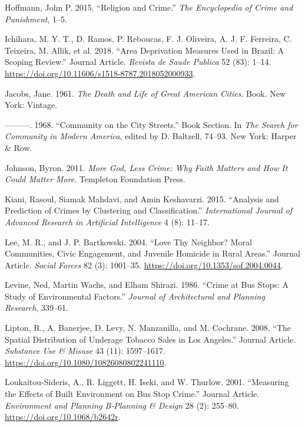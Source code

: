 \documentclass[smallextended]{svjour3}       %
\begin{document}
\leavevmode\hypertarget{ref-Hoffmann2015religion}{}%
Hoffmann, John P. 2015. ``Religion and Crime.'' \emph{The Encyclopedia
of Crime and Punishment}, 1--5.

\leavevmode\hypertarget{ref-Ichihara2018area}{}%
Ichihara, M. Y. T., D. Ramos, P. Reboucas, F. J. Oliveira, A. J. F.
Ferreira, C. Teixeira, M. Allik, et al. 2018. ``Area Deprivation
Measures Used in Brazil: A Scoping Review.'' Journal Article.
\emph{Revista de Saude Publica} 52 (83): 1--14.
\url{https://doi.org/10.11606/s1518-8787.2018052000933}.

\leavevmode\hypertarget{ref-Jacobs1961death}{}%
Jacobs, Jane. 1961. \emph{The Death and Life of Great American Cities}.
Book. New York: Vintage.

\leavevmode\hypertarget{ref-Jacobs1968community}{}%
---------. 1968. ``Community on the City Streets.'' Book Section. In
\emph{The Search for Community in Modern America}, edited by D.
Baltzell, 74--93. New York: Harper \& Row.

\leavevmode\hypertarget{ref-Johnson2011more}{}%
Johnson, Byron. 2011. \emph{More God, Less Crime: Why Faith Matters and
How It Could Matter More}. Templeton Foundation Press.

\leavevmode\hypertarget{ref-Kiani2015analysis}{}%
Kiani, Rasoul, Siamak Mahdavi, and Amin Keshavarzi. 2015. ``Analysis and
Prediction of Crimes by Clustering and Classification.''
\emph{International Journal of Advanced Research in Artificial
Intelligence} 4 (8): 11--17.

\leavevmode\hypertarget{ref-Lee2004love}{}%
Lee, M. R., and J. P. Bartkowski. 2004. ``Love Thy Neighbor? Moral
Communities, Civic Engagement, and Juvenile Homicide in Rural Areas.''
Journal Article. \emph{Social Forces} 82 (3): 1001--35.
\url{https://doi.org/10.1353/sof.2004.0044}.

\leavevmode\hypertarget{ref-Levine1986crime}{}%
Levine, Ned, Martin Wachs, and Elham Shirazi. 1986. ``Crime at Bus
Stops: A Study of Environmental Factors.'' \emph{Journal of
Architectural and Planning Research}, 339--61.

\leavevmode\hypertarget{ref-Lipton2008spatial}{}%
Lipton, R., A. Banerjee, D. Levy, N. Manzanilla, and M. Cochrane. 2008.
``The Spatial Distribution of Underage Tobacco Sales in Los Angeles.''
Journal Article. \emph{Substance Use \& Misuse} 43 (11): 1597--1617.
\url{https://doi.org/10.1080/10826080802241110}.

\leavevmode\hypertarget{ref-Loukaitou2001measuring}{}%
Loukaitou-Sideris, A., R. Liggett, H. Iseki, and W. Thurlow. 2001.
``Measuring the Effects of Built Environment on Bus Stop Crime.''
Journal Article. \emph{Environment and Planning B-Planning \& Design} 28
(2): 255--80. \url{https://doi.org/10.1068/b2642r}.
\end{document}
